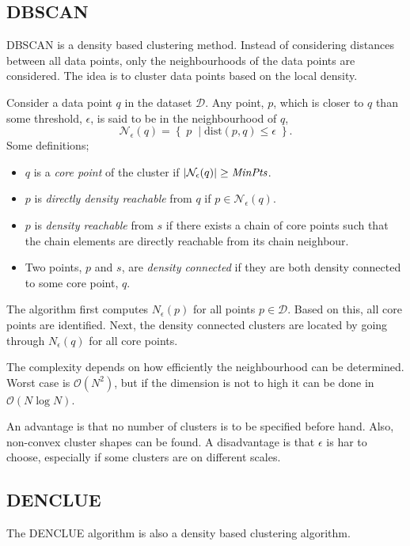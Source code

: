 \documentclass[oneside]{memoir}
\begin{document}
\subsection{DBSCAN}
DBSCAN is a density based clustering method. Instead of considering distances between all data points, only the neighbourhoods of the data points are considered. The idea is to cluster data points based on the local density.

Consider a data point $q$ in the dataset $\mathcal{D}$. Any point, $p$, which is closer to $q$ than some threshold, $\epsilon$, is said to be in the neighbourhood of $q$,
\begin{equation}
  \label{neighbourhood of q}
\mathcal{N}_\epsilon(q) = \left\{\;p\;\;|\; \text{dist}(p,q)\leq \epsilon\; \right\}.
\end{equation}
Some definitions;
\begin{itemize}
\item $q$ is a \emph{core point} of the cluster if $|\mathcal{N}_\epsilon(q)| \geq \text{\emph{MinPts}}$. 
\item $p$ is \emph{directly density reachable} from $q$ if $p \in \mathcal{N}_\epsilon(q)$. 
\item $p$ is \emph{density reachable} from $s$ if there exists a chain of core points such that the chain elements are directly reachable from its chain neighbour.
\item Two points, $p$ and $s$, are \emph{density connected} if they are both density connected to some core point, $q$.
\end{itemize}
The algorithm first computes $N_\epsilon(p)$ for all points $p\in \mathcal{D}$. Based on this, all core points are identified. Next, the density connected clusters are located by going through $N_\epsilon(q)$ for all core points.

The complexity depends on how efficiently the neighbourhood can be determined. Worst case is $\mathcal{O}(N^2)$, but if the dimension is not to high it can be done in $\mathcal{O}(N\log N)$.

An advantage is that no number of clusters is to be specified before hand. Also, non-convex cluster shapes can be found. A disadvantage is that $\epsilon$ is har to choose, especially if some clusters are on different scales.

\subsection{DENCLUE}
The DENCLUE algorithm is also a density based clustering algorithm. 
\end{document}

